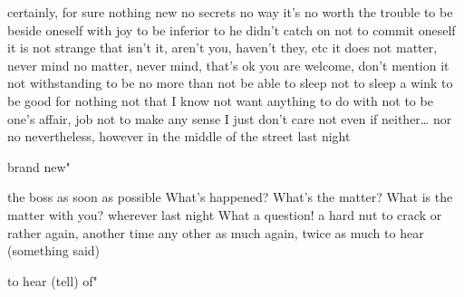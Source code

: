 {{{{{{{{{{  
{certainly, for sure}
{nothing new}
{no secrets}
{no way}
{it’s no worth the trouble}
{to be beside oneself with joy}
{to be inferior to}
{he didn’t catch on}
{not to commit oneself}
{it is not strange that}
{isn’t it, aren’t you, haven’t they, etc}
{it does not matter, never mind}
{no matter, never mind, that’s ok}
{you are welcome, don’t mention it}
{not withstanding}
{to be no more than}
{not be able to sleep}
{not to sleep a wink}
{to be good for nothing}
{not that I know}
{not want anything to do with}
{not to be one’s affair, job}
{not to make any sense}
{I just don’t care}
{not even if}
{neither… nor no}
{nevertheless, however}
{in the middle of the street}
{last night}
{brand new"

{the boss}
{as soon as possible}
{What’s happened?}
{What’s the matter?}
{What is the matter with you?}
{wherever}
{last night}
{What a question!}
{a hard nut to crack}
{or rather}
{again, another time}
{any other}
{as much again, twice as much}
{to hear (something said)}
{to hear (tell) of"

}}}}}}}}}}}}
